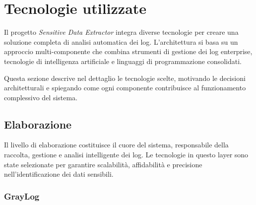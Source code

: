 \documentclass[12pt]{report}
\begin{document}




%
%







%
%

\chapter{Tecnologie utilizzate}
\label{chap:tecnologie_utilizzate}

Il progetto \textit{Sensitive Data Extractor} integra diverse tecnologie per creare una soluzione completa di analisi automatica dei log. L'architettura si basa su un approccio multi-componente che combina strumenti di gestione dei log enterprise, tecnologie di intelligenza artificiale e linguaggi di programmazione consolidati.

Questa sezione descrive nel dettaglio le tecnologie scelte, motivando le decisioni architetturali e spiegando come ogni componente contribuisce al funzionamento complessivo del sistema.

\section{Elaborazione}
\label{sec:elaborazione}

Il livello di elaborazione costituisce il cuore del sistema, responsabile della raccolta, gestione e analisi intelligente dei log. Le tecnologie in questo layer sono state selezionate per garantire scalabilità, affidabilità e precisione nell'identificazione dei dati sensibili.

\subsection{GrayLog}
\label{subsec:graylog}
\end{document}
